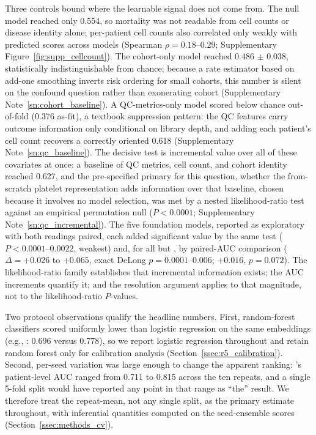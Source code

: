 Three controls bound where the learnable signal does not come from. The null
model reached only 0.554, so mortality was not readable from cell counts or
disease identity alone; per-patient cell counts also correlated only weakly
with predicted scores across models (Spearman $\rho = 0.18$--$0.29$;
Supplementary Figure~\ref{fig:supp_cellcount}). The cohort-only model reached
0.486 $\pm$ 0.038, statistically indistinguishable from chance; because a
rate estimator based on add-one smoothing inverts risk ordering for small
cohorts, this number is silent on the confound question rather than
exonerating cohort (Supplementary Note~\ref{sn:cohort_baseline}). A
QC-metrics-only model scored below chance out-of-fold (0.376 as-fit), a
textbook suppression pattern: the QC features carry outcome information only
conditional on library depth, and adding each patient's cell count recovers a
correctly oriented 0.618 (Supplementary Note~\ref{sn:qc_baseline}). The
decisive test is incremental value over all of these covariates at once:
a baseline of QC metrics, cell count, and cohort identity reached 0.627, and
the pre-specified primary for this question, whether the from-scratch
platelet representation adds information over that baseline, chosen because
it involves no model selection, was met by a nested likelihood-ratio test
against an empirical permutation null ($P < 0.0001$;
Supplementary Note~\ref{sn:qc_incremental}). The five foundation models,
reported as exploratory with both readings paired, each added significant
value by the same test ($P < 0.0001$--$0.0022$,  weakest) and, for
all but , by paired-AUC comparison ($\Delta = +0.026$ to $+0.065$,
exact DeLong $p = 0.0001$--$0.006$;  $+0.016$, $p = 0.072$). The
likelihood-ratio family establishes that incremental information exists; the
AUC increments quantify it; and the resolution argument applies to that
magnitude, not to the likelihood-ratio $P$-values.

Two protocol observations qualify the headline numbers. First, random-forest
classifiers scored uniformly lower than logistic regression on the same
embeddings (e.g., : 0.696 versus 0.778), so we report logistic
regression throughout and retain random forest only for calibration analysis
(Section~\ref{ssec:r5_calibration}). Second, per-seed variation was large enough
to change the apparent ranking: 's patient-level AUC ranged from
0.711 to 0.815 across the ten repeats, and a single 5-fold split would have
reported any point in that range as ``the'' result. We therefore treat the
repeat-mean, not any single split, as the primary estimate throughout, with
inferential quantities computed on the seed-ensemble scores
(Section~\ref{ssec:methods_cv}).

